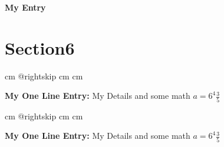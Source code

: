\documentclass[10pt, letterpaper]{article}
\let\originalTabularx\tabularx
\let\originalEndTabularx\endtabularx
\renewenvironment{tabularx}{\bgroup\centering\originalTabularx}{\originalEndTabularx\par\egroup}
\begin{document}
        \vspace{0.2 cm}
        \begin{tabularx}{
            \textwidth-0.4 cm-0.13cm
        }{
            K{0.2 cm}
        }
            \textbf{My Entry}

            \vspace{0.10 cm}

        \end{tabularx}



    
    \section{Section6}

        \begingroup{} cm
        \advance\csname @rightskip cm
        \advance{} cm

        \textbf{My One Line Entry:} My Details and some math $a=6^4 \frac{3}{5}$ \par\endgroup

        \vspace{0.2 cm}
        \begingroup{} cm
        \advance\csname @rightskip cm
        \advance{} cm

        \textbf{My One Line Entry:} My Details and some math $a=6^4 \frac{3}{5}$ \par\endgroup


    
\end{document}
